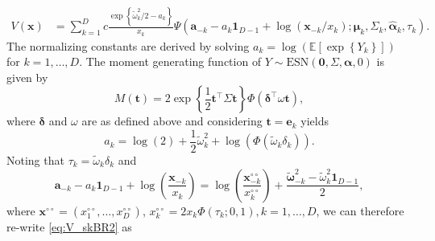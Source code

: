 \documentclass[12pt]{article}
\begin{document}
\begin{align}
\label{eq:V_skBR2}
V(\bm x) &= \sum_{k=1}^D c \frac{\exp\left\{\tilde{\omega}_k^2/2-a_k\right\}}{x_k}
\Psi \left( \bm a_{-k}-a_{k} \bm 1_{D-1}+\log(\bm x_{-k}/x_k) ; \bm \mu_k, \Sigma_k, \hat{\bm \alpha}_k, \tau_k\right).
\end{align}
% 
The normalizing constants are derived by solving $a_k = \log\left( \mathbb{E} \left[ \exp \left\{ Y_k\right\}\right]\right)$ for $k=1, \ldots, D$. The moment generating function of $Y \sim \text{ESN}(\bm 0, \Sigma, \bm \alpha, 0)$ is given by
%
$$
M(\bm t)  = 2 \exp \left\{ \frac{1}{2} \bm t^\top \Sigma \bm t \right\} \Phi\left( \bm \delta^\top \omega \bm t\right),
$$
%
where $\bm \delta$ and $\omega$ are as defined above and considering $\bm t = \bm e_k$ yields 
%
$$
a_k = \log(2) + \frac{1}{2} \tilde{\omega}_k^2 + \log \left( \Phi\left( \tilde{\omega}_{k} \delta_k \right)\right).
$$
Noting that $\tau_k = \tilde{\omega}_k \delta_k$ and
%
$$
\bm a_{-k}-a_{k} \bm 1_{D-1}+\log \left(\frac{\bm x_{-k}}{x_k}\right)
= \log \left( \frac{\bm x^{\circ\circ}_{-k}}{x^{\circ\circ}_k} \right) + \frac{\tilde{\bm \omega}_{-k}^2 - \tilde{\omega}_k^2\bm 1_{D-1}}{2},
$$
where $\bm x^{\circ\circ} = \left( x^{\circ\circ}_1, \ldots, x^{\circ\circ}_D\right)$, $x^{\circ\circ}_k = 2x_k \Phi\left( \tau_k; 0, 1 \right), k=1, \ldots, D$,
we can therefore re-write \eqref{eq:V_skBR2} as
%
\end{document}
